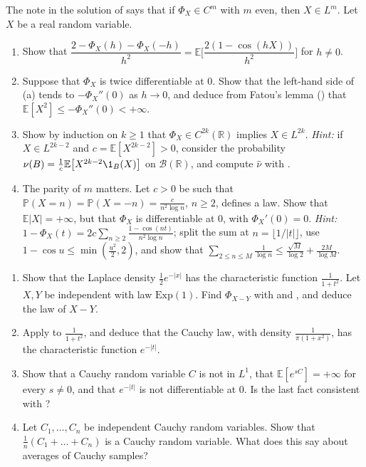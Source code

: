 \begin{exercise}\label{ex:cf-even-moments}
\hard The note in the solution of  says that if $\Phi_X\in C^m$
with $m$ even, then $X\in L^m$. Let $X$ be a real random variable.
\begin{enumerate}[label=(\alph*)]
  \item Show that
    $\dfrac{2-\Phi_X(h)-\Phi_X(-h)}{h^2}=\mathbb E\Big[\dfrac{2(1-\cos(hX))}{h^2}\Big]$ for
    $h\ne0$.
  \item Suppose that $\Phi_X$ is twice differentiable at $0$. Show that the left-hand side of (a)
    tends to $-\Phi_X''(0)$ as $h\to0$, and deduce from Fatou's lemma ()
    that $\mathbb E[X^2]\le-\Phi_X''(0)<+\infty$.
  \item Show by induction on $k\ge1$ that $\Phi_X\in C^{2k}(\mathbb R)$ implies $X\in L^{2k}$.
    \emph{Hint:} if $X\in L^{2k-2}$ and $c=\mathbb E[X^{2k-2}]>0$, consider the probability
    $\nu(B)=\frac1c\mathbb E\big[X^{2k-2}\1_B(X)\big]$ on $\mathcal B(\mathbb R)$, and compute $\hat\nu$
    with .
  \item The parity of $m$ matters. Let $c>0$ be such that
    $\mathbb P(X=n)=\mathbb P(X=-n)=\frac{c}{n^2\log n}$, $n\ge2$, defines a law. Show that
    $\mathbb E|X|=+\infty$, but that $\Phi_X$ is differentiable at $0$, with $\Phi_X'(0)=0$.
    \emph{Hint:} $1-\Phi_X(t)=2c\sum_{n\ge2}\frac{1-\cos(nt)}{n^2\log n}$; split the sum at
    $n=\lfloor1/|t|\rfloor$, use $1-\cos u\le\min(\frac{u^2}2,2)$, and show that
    $\sum_{2\le n\le M}\frac1{\log n}\le\frac{\sqrt M}{\log2}+\frac{2M}{\log M}$.
\end{enumerate}
\end{exercise}

\begin{exercise}\label{ex:cf-cauchy}
\medium
\begin{enumerate}[label=(\alph*)]
  \item Show that the Laplace density $\frac12e^{-|x|}$ has the characteristic function
    $\frac1{1+t^2}$. Let $X,Y$ be independent with law $\mathrm{Exp}(1)$. Find $\Phi_{X-Y}$ with
     and , and deduce the law of $X-Y$.
  \item Apply  to $\frac1{1+t^2}$, and deduce that the Cauchy law,
    with density $\frac1{\pi(1+x^2)}$, has the characteristic function $e^{-|t|}$.
  \item Show that a Cauchy random variable $C$ is not in $L^1$, that $\mathbb E[e^{sC}]=+\infty$
    for every $s\ne0$, and that $e^{-|t|}$ is not differentiable at $0$. Is the last fact
    consistent with ?
  \item Let $C_1,\dots,C_n$ be independent Cauchy random variables. Show that
    $\frac1n(C_1+\dots+C_n)$ is a Cauchy random variable. What does this say about averages of
    Cauchy samples?
\end{enumerate}
\end{exercise}

